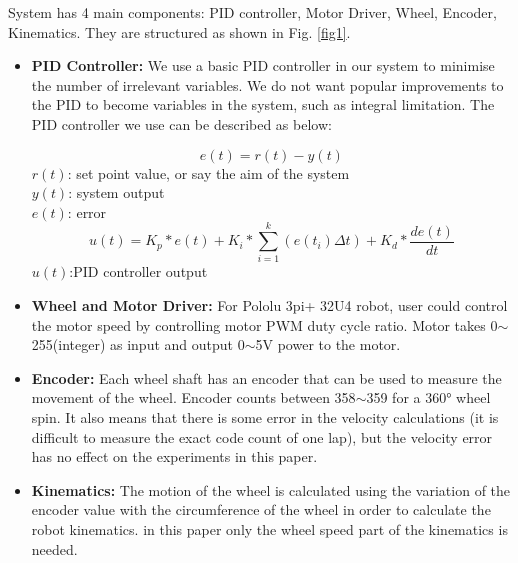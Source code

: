 \documentclass[conference]{IEEEtran}
\begin{document}
System has 4 main components: PID controller, Motor Driver, Wheel, Encoder, Kinematics. They are structured as shown in Fig. \ref{fig1}. 
\begin{itemize}
    \item\textbf{PID Controller: } We use a basic PID controller in our system to minimise the number of irrelevant variables. We do not want popular improvements to the PID to become variables in the system, such as integral limitation. The PID controller we use can be described as below:
    
    
        \begin{equation}\label{PID_1}
            e(t) = r(t) - y(t)      
        \end{equation}
        $r(t)$: set point value, or say the aim of the system\\
        $y(t)$: system output \\
        $e(t)$: error
        \begin{equation}\label{PID_2}
            u(t)=K_{p}*e(t)+K_{i} * \sum_{i=1}^{k}  (e(t_{i})\Delta t)+K_{d} * \frac{de(t)}{dt}
        \end{equation}
        $u(t)$:PID controller output
        \par
    \item\textbf{Wheel and Motor Driver: }For Pololu 3pi+ 32U4 robot, user could control the motor speed by controlling motor PWM duty cycle ratio. Motor takes 0$\sim$255(integer) as input and output 0$\sim$5V power to the motor.
    \item\textbf{Encoder: }Each wheel shaft has an encoder that can be used to measure the movement of the wheel. Encoder counts between 358$\sim$359 for a 360° wheel spin. It also means that there is some error in the velocity calculations (it is difficult to measure the exact code count of one lap), but the velocity error has no effect on the experiments in this paper.
    \item\textbf{Kinematics: }The motion of the wheel is calculated using the variation of the encoder value with the circumference of the wheel in order to calculate the robot kinematics. in this paper only the wheel speed part of the kinematics is needed.

\end{itemize}
\end{document}

